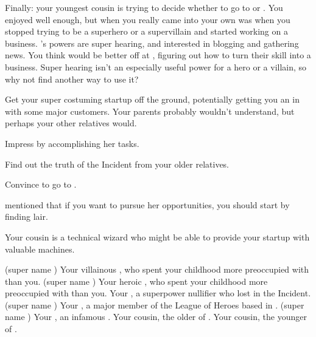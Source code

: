 \documentclass[char]{LRSguildcamp1}
\begin{document}
Finally: your youngest cousin \cTween{} is trying to decide whether to go to \pSuperSchool{} or \pNormalSchool{}.  You enjoyed \pSuperSchool{} well enough, but when you really came into your own was when you stopped trying to be a superhero or a supervillain and started working on a business.  \cTween{}'s powers are super hearing, and \cTween{\theyare} interested in blogging and gathering news.  You think \cTween{\they} would be better off at \pNormalSchool{}, figuring out how to turn their skill into a business.  Super hearing isn't an especially useful power for a hero or a villain, so why not find another way to use it?

\begin{itemz}[Goals]
	\item Get your super costuming startup off the ground, potentially getting you an in with some major customers.  Your parents probably wouldn't understand, but perhaps your other relatives would.
	\item Impress \cGrandma{} by accomplishing her tasks.
	\item Find out the truth of the \pCityO{} Incident from your older relatives.
	\item Convince \cTween{} to go to \pNormalSchool{}.

\end{itemz}

\begin{itemz}[Notes]
	\item \cGrandma{} mentioned that if you want to pursue her opportunities, you should start by finding \cGrandma{\their} lair.
	\item Your cousin \cTeen{} is a technical wizard who might be able to provide your startup with valuable machines.
\end{itemz}

\begin{contacts}
	\contact{\cOldest{\intro}} (super name \cOldest{\MYsupername}) Your villainous \cOldest{\parent}, who spent your childhood more preoccupied with \cOS{} than you.
	\contact{\cOS{\intro}} (super name \cOS{\MYsupername}) Your heroic \cOS{\parent}, who spent your childhood more preoccupied with \cOldest{} than you.
	\contact{\cArchitect{\intro}} Your \cArchitect{\uncle}, a superpower nullifier who lost \cArchitect{\their} \cAS{\spouse} in the \pCityO{} Incident.
	\contact{\cYoungest{\intro}}  (super name \cYoungest{\MYsupername}) Your \cYoungest{\uncle}, a major member of the League of Heroes based in \pCityYoungest{}.
	\contact{\cGrandma{\intro}}  (super name \cGrandma{\MYsupername}) Your \cGrandma{\grandparent}, an infamous \cGrandma{\villain}.
	\contact{\cTeen{\intro}} Your cousin, the older \cTeen{\offspring} of \cArchitect{\Uncle} \cArchitect{}.
	\contact{\cTween{\intro}} Your cousin, the younger \cTween{\offspring} of \cArchitect{\Uncle} \cArchitect{}.
\end{contacts}
\end{document}
